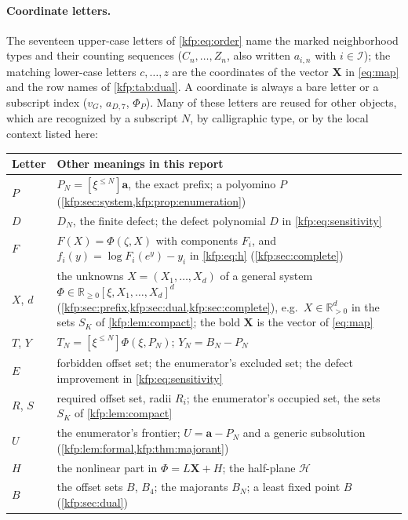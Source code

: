 \documentclass[11pt,a4paper]{article}
\theoremstyle{definition}
\theoremstyle{remark}
\newcommand{\R}{\mathbb R}
\newcommand{\bA}{\boldsymbol a}
\newcommand{\bX}{\boldsymbol X}
\newcommand{\trunc}[2]{[\xi^{\leq #1}]#2}
\begin{document}
\paragraph{Coordinate letters.} The seventeen upper-case letters of
\eqref{kfp:eq:order} name the marked neighborhood types and their counting
sequences ($C_n,\ldots,Z_n$, also written $a_{i,n}$ with $i\in\mathcal I$);
the matching lower-case letters $c,\ldots,z$ are the coordinates of the
vector $\bX$ in \eqref{eq:map} and the row names of \cref{kfp:tab:dual}. A
coordinate is always a bare letter or a subscript index ($v_G$, $a_{D,7}$,
$\Phi_P$). Many of these letters are reused for other objects, which are
recognized by a subscript $N$, by calligraphic type, or by the local context
listed here:
\begin{center}\small
\begin{tabular}{@{}>{\raggedright\arraybackslash}p{}>{\raggedright\arraybackslash}p{}@{}}
\toprule
Letter & Other meanings in this report\\
\midrule
$P$ & $P_N=\trunc{N}{\bA}$, the exact prefix; a polyomino $P$ (\cref{kfp:sec:system,kfp:prop:enumeration})\\
$D$ & $D_N$, the finite defect; the defect polynomial $D$ in \eqref{kfp:eq:sensitivity}\\
$F$ & $F(X)=\Phi(\zeta,X)$ with components $F_i$, and $f_i(y)=\log F_i(e^y)-y_i$ in \eqref{kfp:eq:h} (\cref{kfp:sec:complete})\\
$X$, $d$ & the unknowns $X=(X_1,\ldots,X_d)$ of a general system $\Phi\in\R_{\geq0}[\xi,X_1,\ldots,X_d]^d$ (\cref{kfp:sec:prefix,kfp:sec:dual,kfp:sec:complete}), e.g.\ $X\in\R_{>0}^d$ in the sets $S_K$ of \cref{kfp:lem:compact}; the bold $\bX$ is the vector of \eqref{eq:map}\\
$T$, $Y$ & $T_N=\trunc{N}{\Phi(\xi,P_N)}$; $Y_N=B_N-P_N$\\
$E$ & forbidden offset set; the enumerator's excluded set; the defect improvement in \eqref{kfp:eq:sensitivity}\\
$R$, $S$ & required offset set, radii $R_i$; the enumerator's occupied set, the sets $S_K$ of \cref{kfp:lem:compact}\\
$U$ & the enumerator's frontier; $U=\bA-P_N$ and a generic subsolution (\cref{kfp:lem:formal,kfp:thm:majorant})\\
$H$ & the nonlinear part in $\Phi=L\bX+H$; the half-plane $\mathcal H$\\
$B$ & the offset sets $B$, $B_4$; the majorants $B_N$; a least fixed point $B$ (\cref{kfp:sec:dual})\\

\end{tabular}
\end{center}
\end{document}
